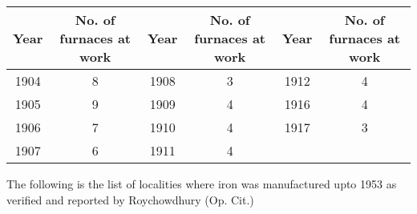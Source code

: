 {\fontsize{7}{9}\selectfont\begin{center}
\begin{tabular}{|c|c|c|c|c|c|}
\hline
\multicolumn{1}{|m{.5cm}|}{\textbf{Year}} & \multicolumn{1}{m{1.5cm}|}{\centering \textbf{No. of furnaces at work}} & 
\multicolumn{1}{m{.5cm}|}{\textbf{Year}} & \multicolumn{1}{m{1.5cm}|}{\centering \textbf{No. of furnaces at work}} & 
\multicolumn{1}{m{.5cm}|}{\textbf{Year}} & \multicolumn{1}{m{1.5cm}|}{\centering \textbf{No. of furnaces at work}}\\
\hline
1904 & 8 & 1908 & 3 & 1912 & 4\\
1905 & 9 & 1909 & 4 & 1916 & 4\\
1906 & 7 & 1910 & 4 & 1917 & 3\\
1907 & 6 & 1911 & 4 &  & \\
\hline
\end{tabular}
\end{center}}

\newpage

The following is the list of localities where iron was manufactured upto 1953 as verified and reported by Roychowdhury (Op. Cit.) 

